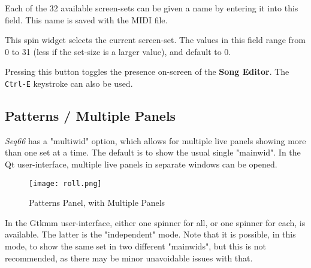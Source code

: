    Each of the 32 available screen-sets can be given a name by entering it
   into this field.  This name is saved with the MIDI file.

%

   This spin widget selects the current screen-set.  The values in this
   field range from 0 to 31 (less if the set-size is a larger value),
   and default to 0.

%

   Pressing this button toggles the presence on-screen of the
   \textbf{Song Editor}.  The \texttt{Ctrl-E} keystroke can also be used.

\subsection{Patterns / Multiple Panels}
\label{subsec:patterns_panel_multiple}

   \textsl{Seq66} has a "multiwid" option, which
   allows for
   multiple live panels showing more than one set at a time.
   The default is to show the usual single "mainwid".
   In the Qt user-interface, multiple live panels in separate windows
   can be opened.

\begin{figure}[H]
   \centering 
   \texttt{[image: roll.png]}
   \caption{Patterns Panel, with Multiple Panels}
   \label{fig:pattern_window_bottom_panel_multiple}
\end{figure}

   In the Gtkmm user-interface, either one spinner for all, or one spinner for
   each, is available.  The latter is the "independent" mode.
   Note that it is possible, in this mode, to show the same set in two
   different "mainwids", but this is not recommended, as there may be minor
   unavoidable issues with that.

